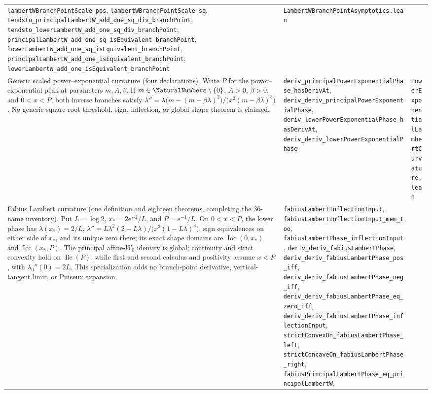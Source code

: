 \documentclass[11pt,oneside]{article}
\theoremstyle{definition}
\theoremstyle{remark}
\begin{document}
\begin{longtable}{@{}p{}p{}p{}@{}}
\nolinkurl{lambertWBranchPointScale_pos},
\nolinkurl{lambertWBranchPointScale_sq},
\nolinkurl{tendsto_principalLambertW_add_one_sq_div_branchPoint},
\nolinkurl{tendsto_lowerLambertW_add_one_sq_div_branchPoint},
\nolinkurl{principalLambertW_add_one_sq_isEquivalent_branchPoint},
\nolinkurl{lowerLambertW_add_one_sq_isEquivalent_branchPoint},
\nolinkurl{principalLambertW_add_one_isEquivalent_branchPoint},
\nolinkurl{lowerLambertW_add_one_isEquivalent_branchPoint} &
\nolinkurl{LambertWBranchPointAsymptotics.lean} \\
Generic scaled power--exponential curvature (four declarations).  Write \(P\)
for the power--exponential peak at parameters \(m,A,\beta\).
If \(m\in\NaturalNumbers\setminus\{0\}\), \(A>0\), \(\beta>0\), and \(0<x<P\), both
inverse branches satisfy
\(\lambda''=\lambda\bigl(m-(m-\beta\lambda)^2\bigr)/
\bigl(x^2(m-\beta\lambda)^3\bigr)\).  No generic square-root threshold,
sign, inflection, or global shape theorem is claimed. &
\nolinkurl{deriv_principalPowerExponentialPhase_hasDerivAt},
\nolinkurl{deriv_deriv_principalPowerExponentialPhase},
\nolinkurl{deriv_lowerPowerExponentialPhase_hasDerivAt},
\nolinkurl{deriv_deriv_lowerPowerExponentialPhase} &
\nolinkurl{PowerExponentialLambertCurvature.lean} \\
Fabius Lambert curvature (one definition and eighteen theorems, completing
the 36-name inventory).  Put \(L=\log2\),
\(x_*=2e^{-2}/L\), and \(P=e^{-1}/L\).  On \(0<x<P\), the lower phase has
\(\lambda(x_*)=2/L\),
\(\lambda''=L\lambda^2(2-L\lambda)/
\bigl(x^2(1-L\lambda)^3\bigr)\), sign equivalences on either side of \(x_*\),
and its unique zero there; its exact shape domains are
\(\operatorname{Ioc}(0,x_*)\) and \(\operatorname{Icc}(x_*,P)\).
The principal affine-\(W_0\) identity is global; continuity and strict
convexity hold on \(\operatorname{Iic}(P)\), while first and second calculus
and positivity assume \(x<P\), with \(\lambda_0''(0)=2L\).  This
specialization adds no branch-point derivative, vertical-tangent limit, or
Puiseux expansion. &
\nolinkurl{fabiusLambertInflectionInput},
\nolinkurl{fabiusLambertInflectionInput_mem_Ioo},
\nolinkurl{fabiusLambertPhase_inflectionInput},
\nolinkurl{deriv_deriv_fabiusLambertPhase},
\nolinkurl{deriv_deriv_fabiusLambertPhase_pos_iff},
\nolinkurl{deriv_deriv_fabiusLambertPhase_neg_iff},
\nolinkurl{deriv_deriv_fabiusLambertPhase_eq_zero_iff},
\nolinkurl{deriv_deriv_fabiusLambertPhase_inflectionInput},
\nolinkurl{strictConvexOn_fabiusLambertPhase_left},
\nolinkurl{strictConcaveOn_fabiusLambertPhase_right},
\nolinkurl{fabiusPrincipalLambertPhase_eq_principalLambertW},

\end{longtable}
\end{document}
